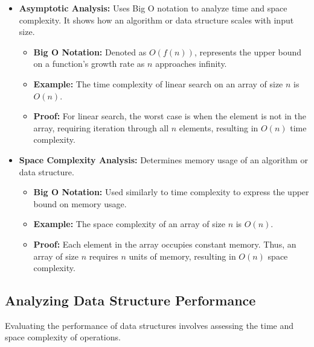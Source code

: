 \documentclass[12pt]{book} %
\begin{document}
\begin{itemize}
    \item \textbf{Asymptotic Analysis:} Uses Big O notation to analyze time and space complexity. It shows how an algorithm or data structure scales with input size.
    \begin{itemize}
        \item \textbf{Big O Notation:} Denoted as \(O(f(n))\), represents the upper bound on a function's growth rate as \(n\) approaches infinity.
        \item \textbf{Example:} The time complexity of linear search on an array of size \(n\) is \(O(n)\).
        \item \textbf{Proof:} For linear search, the worst case is when the element is not in the array, requiring iteration through all \(n\) elements, resulting in \(O(n)\) time complexity.
    \end{itemize}
    \item \textbf{Space Complexity Analysis:} Determines memory usage of an algorithm or data structure.
    \begin{itemize}
        \item \textbf{Big O Notation:} Used similarly to time complexity to express the upper bound on memory usage.
        \item \textbf{Example:} The space complexity of an array of size \(n\) is \(O(n)\).
        \item \textbf{Proof:} Each element in the array occupies constant memory. Thus, an array of size \(n\) requires \(n\) units of memory, resulting in \(O(n)\) space complexity.
    \end{itemize}
\end{itemize}

\subsection{Analyzing Data Structure Performance}
Evaluating the performance of data structures involves assessing the time and space complexity of operations.
\end{document}
